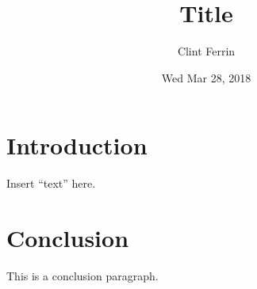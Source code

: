\title { Title            }
\author{ Clint Ferrin     }
\date  { Wed Mar 28, 2018 }
\def\class{ Class: ECE 5930 }



   \pageSetup
   \createTitlePage
   \createTableOfContents

    \section{Introduction}\label{sec:intro}
    Insert “text” here.


   \section{Conclusion}\label{sec:conclusion}
        This is a conclusion paragraph. 



